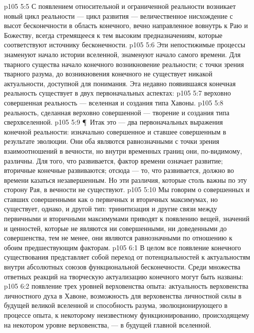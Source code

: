 \vs p105 5:5 С появлением относительной и ограниченной реальности возникает новый цикл реальности --- цикл развития --- величественное нисхождение с высот бесконечности в область конечного, вечно направленное вовнутрь к Раю и Божеству, всегда стремящееся к тем высоким предназначениям, которые соответствуют источнику бесконечности.
\vs p105 5:6 Эти непостижимые процессы знаменуют начало истории вселенной, знаменуют начало самого времени. Для тварного существа начало конечного  возникновение реальности; с точки зрения тварного разума, до возникновения конечного не существует никакой актуальности, доступной для понимания. Эта недавно появившаяся конечная реальность существует в двух первоначальных аспектах:
\vs p105 5:7 \bibnobreakspace {} верховно совершенная реальность --- вселенная и создания типа Хавоны.
\vs p105 5:8 \bibnobreakspace {} реальность, сделанная верховно совершенной --- творение и создания типа сверхвселенной.
\vs p105 5:9 \P\ Итак это --- два первоначальных выражения конечной реальности: изначально совершенное и ставшее совершенным в результате эволюции. Они оба являются равнозначными с точки зрения взаимоотношений в вечности, но внутри временных границ они, по\hyp{}видимому, различны. Для того, что развивается, фактор времени означает развитие; вторичные конечные развиваются; отсюда --- то, что развивается, должно во времени казаться незавершенным. Но эти различия, которые столь важны по эту сторону Рая, в вечности не существуют.
\vs p105 5:10 Мы говорим о совершенных и ставших совершенными как о первичных и вторичных максимумах, но существует, однако, и другой тип: тринитизация и другие связи между первичными и вторичными максимумами приводят к появлению  вещей, значений и ценностей, которые не являются ни совершенными, ни доведенными до совершенства, тем не менее, они являются равнозначными по отношению к обоим предшествующим факторам.
\vs p105 6:1 В целом все появление конечного существования представляет собой переход от потенциальностей к актуальностям внутри абсолютных союзов функциональной бесконечности. Среди множества ответных реакций на творческую актуализацию конечного могут быть названы:
\vs p105 6:2 \bibnobreakspace {} появление трех уровней верховенства опыта: актуальность верховенства личностного духа в Хавоне, возможность для верховенства личностной силы в будущей великой вселенной и способность разума, эволюционирующего в процессе опыта, к некоторому неизвестному функционированию, происходящему на некотором уровне верховенства, --- в будущей главной вселенной.
